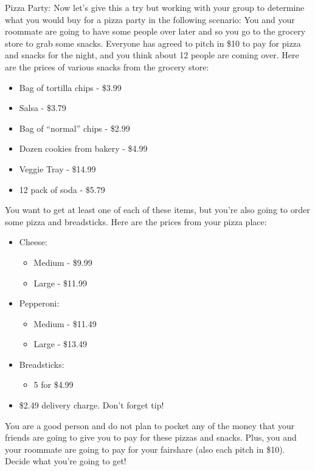 \documentclass{ximera}
\begin{document}
\begin{exploration}Pizza Party: 
Now let’s give this a try but working with your group to determine what you would buy for a pizza party in the following scenario: 
You and your roommate are going to have some people over later and so you go to the grocery store to grab some snacks.  Everyone has agreed to pitch in \$10 to pay for pizza and snacks for the night, and you think about 12 people are coming over.  Here are the prices of various snacks from the grocery store: 
\begin{itemize}
    \item Bag of tortilla chips - \$3.99 
    \item Salsa - \$3.79 
    \item Bag of “normal” chips - \$2.99 
    \item Dozen cookies from bakery - \$4.99 
    \item Veggie Tray - \$14.99 
    \item 12 pack of soda - \$5.79 
\end{itemize}
You want to get at least one of each of these items, but you’re also going to order some pizza and breadsticks. 
Here are the prices from your pizza place: 
\begin{itemize}
    \item Cheese: 
    \begin{itemize}
        \item Medium - \$9.99 
        \item Large - \$11.99 
    \end{itemize}
    \item Pepperoni: 
    \begin{itemize}
        \item Medium - \$11.49 
        \item Large - \$13.49 
    \end{itemize}
    \item Breadsticks: 
    \begin{itemize}
        \item 5 for \$4.99 
    \end{itemize}
    \item \$2.49 delivery charge.  Don’t forget tip! 
\end{itemize}


You are a good person and do not plan to pocket any of the money that your friends are going to give you to pay for these pizzas and snacks.  Plus, you and your roommate are going to pay for your fairshare (also each pitch in \$10).  Decide what you’re going to get! 
\end{exploration}
\end{document}
